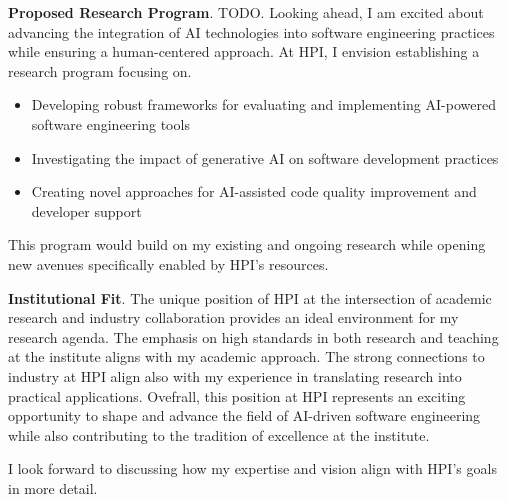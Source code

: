 \textbf{Proposed Research Program}. TODO.
Looking ahead, I am  excited about advancing the integration of AI technologies into software engineering practices while ensuring a human-centered approach. At HPI, I envision establishing a research program focusing on.

\begin{itemize}
\item Developing robust frameworks for evaluating and implementing AI-powered software engineering tools
\item Investigating the impact of generative AI on software development practices
\item Creating novel approaches for AI-assisted code quality improvement and developer support
\end{itemize}

This program would build on my existing and ongoing research while opening new avenues specifically enabled by HPI's resources.

\textbf{Institutional Fit}. 
The unique position of HPI at the intersection of academic research and industry collaboration provides an ideal environment for my research agenda. 
The emphasis on high standards in both research and teaching at the institute aligns with my academic approach.
The strong connections to industry at HPI align also with my experience in translating research into practical applications. 
Ovefrall, this position at HPI represents an exciting opportunity to shape and advance the field of AI-driven software engineering while also contributing to the tradition of excellence at the institute.

I look forward to discussing how my expertise and vision align with HPI's goals in more detail.